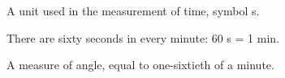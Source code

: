 A unit used in the measurement of time, symbol s.
\par
There are sixty seconds in every minute:  60 s = 1 min.

A measure of angle, equal to one-sixtieth of a minute.